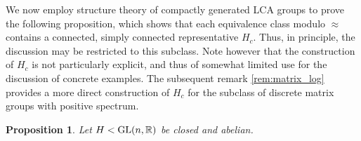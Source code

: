 \documentclass[12pt]{amsart}
\newtheorem{prop}[thm]{Proposition}
\begin{document}
We now employ structure theory of compactly generated LCA
groups to prove the following proposition, which shows that each equivalence class modulo $\approx$ contains a connected, simply connected representative $H_c$. Thus, in principle, the discussion may be restricted to this subclass. Note however that the construction of $H_c$ is not particularly explicit, and thus of somewhat limited use for the discussion of concrete examples.  The subsequent remark
\ref{rem:matrix_log} provides a more direct construction of $H_c$ for the subclass of discrete matrix groups with positive spectrum.
\begin{prop} \label{prop:struct_ab}
Let $H < {\rm GL}(n,{{\mathbb R}})$ be closed and abelian.
\end{prop}
\end{document}
